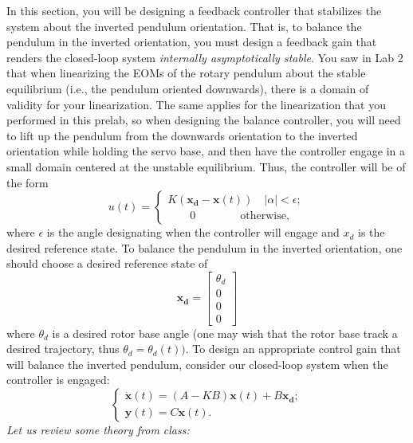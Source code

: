 In this section, you will be designing a feedback controller that stabilizes the system about the inverted pendulum orientation. That is, to balance the pendulum in the inverted orientation, you must design a feedback gain that renders the closed-loop system \emph{internally asymptotically stable}. You saw in Lab 2 that when linearizing the EOMs of the rotary pendulum about the stable equilibrium (i.e., the pendulum oriented downwards), there is a domain of validity for your linearization. The same applies for the linearization that you performed in this prelab, so when designing the balance controller, you will need to lift up the pendulum from the downwards orientation to the inverted orientation while holding the servo base, and then have the controller engage in a small domain centered at the unstable equilibrium. Thus, the controller will be of the form
\[ u(t) =
    \begin{cases}
        K(\mathbf{x_d} - \mathbf{x}(t)) \quad |\alpha| < \epsilon; \\
        \quad \quad 0 \quad \quad \quad \quad \text{otherwise},
    \end{cases}
\]
where $\epsilon$ is the angle designating when the controller will engage and $x_d$ is the desired reference state. To balance the pendulum in the inverted orientation, one should choose a desired reference state of
\[
    \mathbf{x_d} =
    \left[\begin{array}{c}
            \theta_d \\
            0        \\
            0        \\
            0
        \end{array}\right]
\]
where $\theta_d$ is a desired rotor base angle (one may wish that the rotor base track a desired trajectory, thus $\theta_d=\theta_d(t))$. To design an appropriate control gain that will balance the inverted pendulum, consider our closed-loop system when the controller is engaged:
\begin{equation}
    \begin{cases}
        \mathbf{\dot{x}}(t) = \left(A-KB\right)\mathbf{x}(t) + B\mathbf{x_d}; \\
        \mathbf{y}(t) = C\mathbf{x}(t).
    \end{cases}
    \label{equation:lab3_feedback}
\end{equation}
\emph{Let us review some theory from class:}

